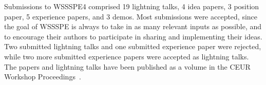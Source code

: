 \documentclass[11pt, oneside]{amsart}
\begin{document}
%
%
%
%
%
%
%
%
%

Submissions to WSSSPE4 comprised
19 lightning talks,
4 idea papers,
3 position paper,
5 experience papers,
and
3 demos.
Most submissions were accepted, since the goal of WSSSPE is always to
take in as many relevant inputs as possible, and to encourage their authors to
participate in sharing and implementing their ideas. Two submitted lightning talks and one submitted experience paper were rejected, while two more submitted experience papers
were accepted as lightning talks.
The papers and lightning talks have been published as a volume in the CEUR Workshop Proceedings~\cite{WSSSPE4-proceedings}.

\end{document}
